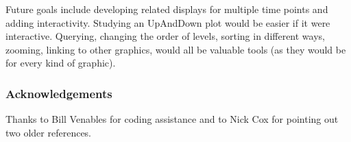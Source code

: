 Future goals include developing related displays for multiple time points and adding interactivity. Studying an UpAndDown plot would be easier if it were interactive. Querying, changing the order of levels, sorting in different ways, zooming, linking to other graphics, would all be valuable tools (as they would be for every kind of graphic).

\hypertarget{acknowledgements}{%
\subsubsection{Acknowledgements}\label{acknowledgements}}

Thanks to Bill Venables for coding assistance and to Nick Cox for pointing out two older references.



\address{%
Antony Unwin\\
University of Augsburg\\%
Mathematics Institute\\ University of Augsburg\\ 86135 Augsburg, Germany\\
%
%
%
\href{mailto:unwin@math.uni-augsburg.de}{\nolinkurl{unwin@math.uni-augsburg.de}}%
}
